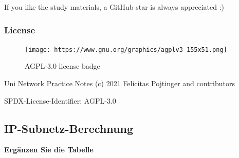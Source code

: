 If you like the study materials, a GitHub star is always appreciated :)

\hypertarget{license}{%
\subsubsection{License}\label{license}}

\begin{figure}
\centering
\texttt{[image: https://www.gnu.org/graphics/agplv3-155x51.png]}
\caption{AGPL-3.0 license badge}
\end{figure}

Uni Network Practice Notes (c) 2021 Felicitas Pojtinger and contributors

SPDX-License-Identifier: AGPL-3.0

\newpage

\hypertarget{ip-subnetz-berechnung}{%
\subsection{IP-Subnetz-Berechnung}\label{ip-subnetz-berechnung}}

\textbf{Ergänzen Sie die Tabelle}

